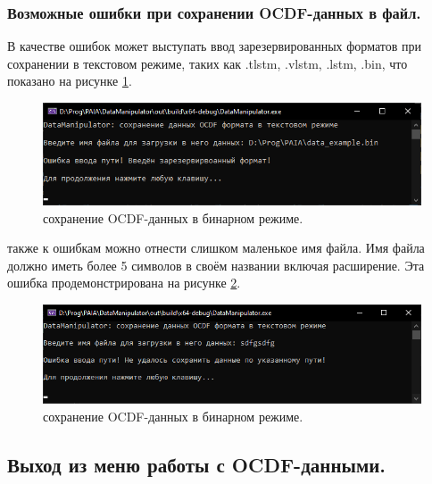 \subsubsection{ \standartTitleFont
  Возможные ошибки при сохранении OCDF-данных в файл.
} \label{subsubsec:OCDFSageErr}

{\standartFont

  \par В качестве ошибок может выступать ввод зарезервированных форматов при сохранении в текстовом режиме, таких как .tlstm, .vlstm, .lstm, .bin, что показано на рисунке \ref{fig:OCDFsafeERes}.

  \begin{figure}[H]
    \centering
    \includegraphics[width=\textwidth]{images/forDataManipulator/OCDFsafeCSVErrReser.png}
    \caption{сохранение OCDF-данных в бинарном режиме.} 
    \label{fig:OCDFsafeERes}
  \end{figure}

  \par также к ошибкам можно отнести слишком маленькое имя файла. Имя файла должно иметь более 5 символов в своём названии включая расширение. Эта ошибка продемонстрирована на рисунке \ref{fig:OCDFsafeEInv}.

  \begin{figure}[H]
    \centering
    \includegraphics[width=\textwidth]{images/forDataManipulator/OCDFsafeCSVErrInvalid.png}
    \caption{сохранение OCDF-данных в бинарном режиме.} 
    \label{fig:OCDFsafeEInv}
  \end{figure}
}

\subsection{ \standartTitleFont
  Выход из меню работы с OCDF-данными.
} \label{subsec:OCDFOut}

